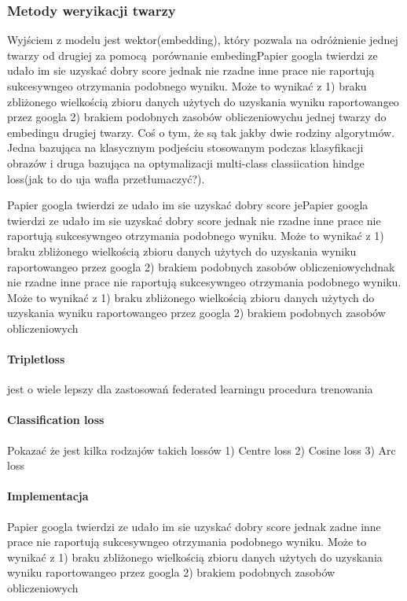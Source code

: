 \subsubsection{Metody weryikacji twarzy}
Wyjściem z modelu jest wektor(embedding), który pozwala na odróżnienie jednej twarzy od drugiej za pomocą porównanie 
embedingPapier googla twierdzi ze udało im sie uzyskać dobry score jednak nie rzadne inne prace nie raportują sukcesywngeo otrzymania podobnego wyniku. Może to wynikać z 1) braku zbliżonego wielkością zbioru danych użytych do uzyskania wyniku raportowangeo przez googla  2) brakiem podobnych zasobów obliczeniowychu jednej twarzy do embedingu drugiej twarzy.
Coś o tym, że są tak jakby dwie rodziny algorytmów. Jedna bazująca na klasycznym podjeściu stosowanym podczas klasyfikacji obrazów i druga bazująca na optymalizacji multi-class classiication hindge loss(jak to do uja wafla przetłumaczyć?).

Papier googla twierdzi ze udało im sie uzyskać dobry score jePapier googla twierdzi ze udało im sie uzyskać dobry score jednak nie rzadne inne prace nie raportują sukcesywngeo otrzymania podobnego wyniku. Może to wynikać z 1) braku zbliżonego wielkością zbioru danych użytych do uzyskania wyniku raportowangeo przez googla  2) brakiem podobnych zasobów obliczeniowychdnak nie rzadne inne prace nie raportują sukcesywngeo otrzymania podobnego wyniku. Może to wynikać z 1) braku zbliżonego wielkością zbioru danych użytych do uzyskania wyniku raportowangeo przez googla  2) brakiem podobnych zasobów obliczeniowych

\paragraph{Tripletloss}
jest o wiele lepszy dla zastosowań federated learningu
procedura trenowania


\paragraph{Classification loss}
Pokazać że jest kilka rodzajów takich lossów
1) Centre loss
2) Cosine loss
3) Arc loss



\paragraph{Implementacja}
Papier googla twierdzi ze udało im sie uzyskać dobry score jednak zadne inne prace nie
raportują sukcesywngeo otrzymania podobnego wyniku. Może to wynikać z 1) braku zbliżonego
wielkością zbioru danych użytych do uzyskania wyniku raportowangeo przez googla 2) brakiem
podobnych zasobów obliczeniowych

